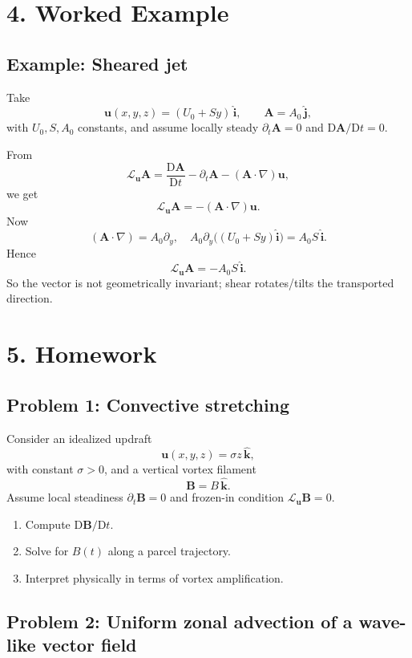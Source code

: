 \documentclass[11pt]{article}
\newcommand{\Lie}{\mathcal{L}}
\newcommand{\DD}{\mathrm{D}}
\newcommand{\ii}{\hat{\mathbf{i}}}
\newcommand{\jj}{\hat{\mathbf{j}}}
\newcommand{\kk}{\hat{\mathbf{k}}}
\begin{document}
\section*{4. Worked Example}

\subsection*{Example: Sheared jet}

Take
\[
\mathbf{u}(x,y,z)=(U_0+Sy)\,\ii,
\qquad
\mathbf{A}=A_0\,\jj,
\]
with $U_0,S,A_0$ constants, and assume locally steady $\partial_t\mathbf{A}=0$ and $\DD\mathbf{A}/\DD t=0$.

From
\[
\Lie_{\mathbf{u}}\mathbf{A} = \frac{\DD\mathbf{A}}{\DD t}-\partial_t\mathbf{A}-(\mathbf{A}\cdot\nabla)\mathbf{u},
\]
we get
\[
\Lie_{\mathbf{u}}\mathbf{A}=-(\mathbf{A}\cdot\nabla)\mathbf{u}.
\]
Now
\[
(\mathbf{A}\cdot\nabla)=A_0\partial_y,
\quad
A_0\partial_y\big((U_0+Sy)\ii\big)=A_0S\,\ii.
\]
Hence
\[
\boxed{\Lie_{\mathbf{u}}\mathbf{A}=-A_0S\,\ii.}
\]
So the vector is not geometrically invariant; shear rotates/tilts the transported direction.

\section*{5. Homework}

\subsection*{Problem 1: Convective stretching}

Consider an idealized updraft
\[
\mathbf{u}(x,y,z)=\sigma z\,\kk,
\]
with constant $\sigma>0$, and a vertical vortex filament
\[
\mathbf{B}=B\,\kk.
\]
Assume local steadiness $\partial_t\mathbf{B}=0$ and frozen-in condition $\Lie_{\mathbf{u}}\mathbf{B}=0$.

\begin{enumerate}[label=\arabic*.]
  \item Compute $\DD\mathbf{B}/\DD t$.
  \item Solve for $B(t)$ along a parcel trajectory.
  \item Interpret physically in terms of vortex amplification.
\end{enumerate}

\subsection*{Problem 2: Uniform zonal advection of a wave-like vector field}
\end{document}
